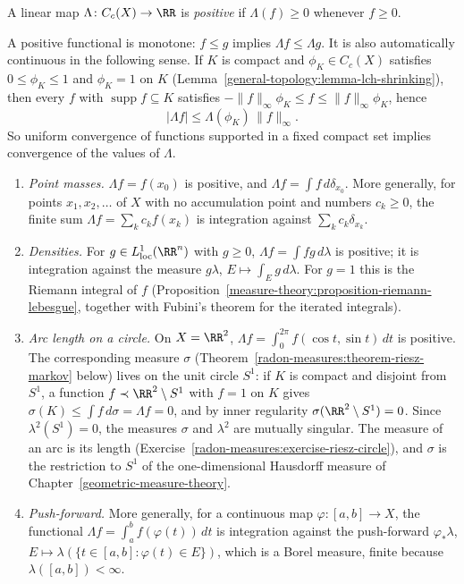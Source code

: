 \begin{definition}\label{radon-measures:definition-positive-functional}
A linear map $\Lambda \colon C_c(X) \to \RR$ is \emph{positive} if $\Lambda(f) \geq 0$ whenever $f \geq 0$.
\end{definition}

A positive functional is monotone: $f \leq g$ implies $\Lambda f \leq \Lambda g$. It is also automatically continuous in the following sense. If $K$ is compact and $\phi_K \in C_c(X)$ satisfies
$0 \leq \phi_K \leq 1$ and $\phi_K = 1$ on $K$ (Lemma~\ref{general-topology:lemma-lch-shrinking}), then every $f$ with $\operatorname{supp}f \subseteq K$ satisfies
$-\|f\|_\infty\phi_K \leq f \leq \|f\|_\infty\phi_K$, hence
\[
|\Lambda f| \leq \Lambda(\phi_K)\,\|f\|_\infty .
\]
So uniform convergence of functions supported in a fixed compact set implies convergence of the values of $\Lambda$.

\begin{example}\label{radon-measures:example-positive-functionals}
\begin{enumerate}
\item \emph{Point masses.} $\Lambda f = f(x_0)$ is positive, and $\Lambda f = \int f\,d\delta_{x_0}$. More generally, for points $x_1, x_2, \ldots$ of $X$ with no accumulation point and numbers
$c_k \geq 0$, the finite sum $\Lambda f = \sum_kc_kf(x_k)$ is integration against $\sum_kc_k\delta_{x_k}$.
\item \emph{Densities.} For $g \in L^1_{\mathrm{loc}}(\RR^n)$ with $g \geq 0$, $\Lambda f = \int fg\,d\lambda$ is positive; it is integration against the measure $g\lambda$, $E \mapsto \int_Eg\,d\lambda$. For
$g = 1$ this is the Riemann integral of $f$ (Proposition~\ref{measure-theory:proposition-riemann-lebesgue}, together with Fubini's theorem for the iterated integrals).
\item \emph{Arc length on a circle.} On $X = \RR^2$, $\Lambda f = \int_0^{2\pi}f(\cos t, \sin t)\,dt$ is positive. The corresponding measure $\sigma$ (Theorem~\ref{radon-measures:theorem-riesz-markov}
below) lives on the unit circle $S^1$: if $K$ is compact and disjoint from $S^1$, a function $f \prec \RR^2 \setminus S^1$ with $f = 1$ on $K$ gives $\sigma(K) \leq \int f\,d\sigma = \Lambda f = 0$, and
by inner regularity $\sigma(\RR^2 \setminus S^1) = 0$. Since $\lambda^2(S^1) = 0$, the measures $\sigma$ and $\lambda^2$ are mutually singular. The measure of an arc is its length
(Exercise~\ref{radon-measures:exercise-riesz-circle}), and $\sigma$ is the restriction to $S^1$ of the one-dimensional Hausdorff measure of Chapter~\ref{geometric-measure-theory}.
\item \emph{Push-forward.} More generally, for a continuous map $\varphi \colon [a, b] \to X$, the functional $\Lambda f = \int_a^bf(\varphi(t))\,dt$ is integration against the push-forward
$\varphi_*\lambda$, $E \mapsto \lambda(\{t \in [a, b] : \varphi(t) \in E\})$, which is a Borel measure, finite because $\lambda([a, b]) < \infty$.
\end{enumerate}
\end{example}


